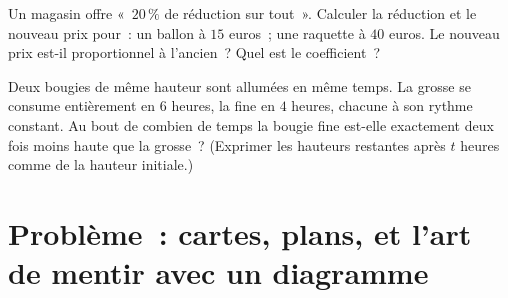 \begin{exercise}[$\star\star$]\label{exo:g6:propdata:11}
Un magasin offre «~$20\,\%$ de réduction sur tout~». Calculer la
réduction et le nouveau prix pour~: un ballon à $15$ euros~; une
raquette à $40$ euros. Le nouveau prix est-il proportionnel à
l'ancien~? Quel est le coefficient~?
\end{exercise}

\begin{exercise}[$\star\star\star$]\label{exo:g6:propdata:12}
Deux bougies de même hauteur sont allumées en même temps. La grosse
se consume entièrement en $6$ heures, la fine en $4$ heures, chacune
à son rythme constant. Au bout de combien de temps la bougie fine
est-elle exactement deux fois moins haute que la grosse~? (Exprimer
les hauteurs restantes après $t$ heures comme  de la hauteur
initiale.)
\end{exercise}

\section{Problème~: cartes, plans, et l'art de mentir avec un
diagramme}

